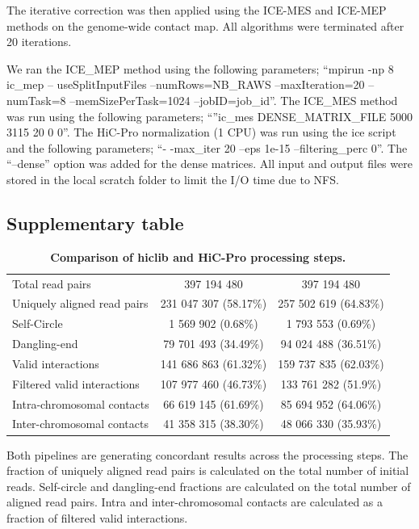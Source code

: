 The iterative correction was then applied using the ICE-MES and ICE-MEP
methods on the genome-wide contact map. All algorithms were terminated after
20 iterations.


We ran the ICE\_MEP method using the following parameters; “mpirun -np 8 ic\_mep
– useSplitInputFiles –numRows=NB\_RAWS –maxIteration=20 –numTask=8
–memSizePerTask=1024 –jobID=job\_id”. The ICE\_MES method was run using the
following parameters; “”ic\_mes DENSE\_MATRIX\_FILE 5000 3115 20 0 0”. The
HiC-Pro normalization (1 CPU) was run using the ice script and the following
parameters; “- -max\_iter 20 –eps 1e-15 –filtering\_perc 0”. The “--dense”
option was added for the dense matrices. All input and output files were
stored in the local scratch folder to limit the I/O time due to NFS.


\subsection{Supplementary table}
\begin{table}
\begin{tabular}{lcc}
Total read pairs & 397 194 480 & 397 194 480 \\
Uniquely aligned read pairs & 231 047 307 (58.17\%) & 257 502 619 (64.83\%) \\
Self-Circle & 1 569 902 (0.68\%) & 1 793 553 (0.69\%) \\
Dangling-end & 79 701 493 (34.49\%) & 94 024 488 (36.51\%) \\
Valid interactions & 141 686 863 (61.32\%) & 159 737 835 (62.03\%) \\
Filtered valid interactions & 107 977 460 (46.73\%) & 133 761 282 (51.9\%) \\
Intra-chromosomal contacts & 66 619 145 (61.69\%) & 85 694 952 (64.06\%) \\
Inter-chromosomal contacts & 41 358 315 (38.30\%) & 48 066 330 (35.93\%) \\
\end{tabular}
\caption{\bf Comparison of hiclib and HiC-Pro processing steps.}{
Both pipelines are generating concordant results across the processing steps.
The fraction of uniquely aligned read pairs is calculated on the total number
of initial reads. Self-circle and dangling-end fractions are calculated on the
total number of aligned read pairs. Intra and inter-chromosomal contacts are
calculated as a fraction of filtered valid interactions. }
\label{supptable:supptable1}
\end{table}

